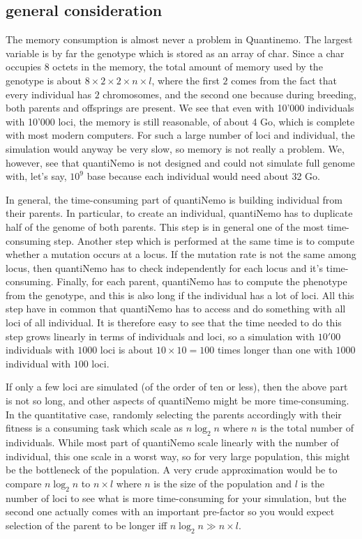 \documentclass[letterpaper,12pt,oneside]{book}
\begin{document}
\begin{appendices}
\section{general consideration}
The memory consumption is almost never a problem in Quantinemo. The largest variable is by far the genotype which is stored as an array of char. Since a char occupies 8 octets in the memory, the total amount of memory used by the genotype is about $8\times2\times 2\times n \times l$, where the first $2$ comes from the fact that every individual has $2$ chromosomes, and the second one because during breeding, both parents and offsprings are present. We see that even with 10'000 individuals with 10'000 loci, the memory is still reasonable, of about 4 Go, which is complete with most modern computers.  For such a large number of loci and individual, the simulation would anyway be very slow, so memory is not really a problem. We, however, see that quantiNemo is not designed and could not simulate full genome with, let's say, $10^9$ base because each individual would need about 32 Go. 

In general, the time-consuming part of quantiNemo is building individual from their parents. In particular, to create an individual, quantiNemo has to duplicate half of the genome of both parents. This step is in general one of the most time-consuming step. Another step which is performed at the same time is to compute whether a mutation occurs at a locus. If the mutation rate is not the same among locus, then quantiNemo has to check independently for each locus and it's time-consuming. Finally, for each parent, quantiNemo has to compute the phenotype from the genotype, and this is also long if the individual has a lot of loci. All this step have in common that quantiNemo has to access and do something with all loci of all individual. It is therefore easy to see that the time needed to do this step grows linearly in terms of individuals and loci, so a simulation with $10'00$ individuals with $1000$ loci is about $10 \times 10 = 100$ times longer than one with $1000$ individual with $100$ loci. 

If only a few loci are simulated (of the order of ten or less), then the above part is not so long, and other aspects of quantiNemo might be more time-consuming. In the quantitative case, randomly selecting the parents accordingly with their fitness is a consuming task which scale as $n\log_2n$ where $n$ is the total number of individuals. While most part of quantiNemo scale linearly with the number of individual, this one scale in a worst way, so for very large population, this might be the bottleneck of the population. A very crude approximation would be to compare $n\log_2n$ to $n\times l$ where $n$ is the size of the population and $l$ is the number of loci to see what is more time-consuming for your simulation, but the second one actually comes with an important pre-factor so you would expect selection of the parent to be longer iff $n\log_2n \gg n\times l$.


\end{appendices}
\end{document}
